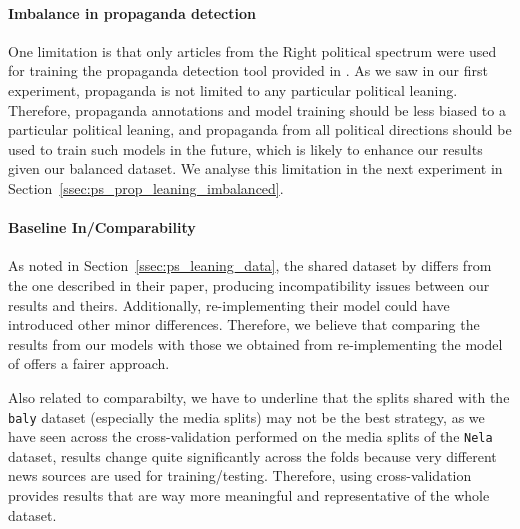 \paragraph{Imbalance in propaganda detection} One limitation is that only articles from the Right political spectrum were used for training the propaganda detection tool provided in \cite{da2019fine}. %
As we saw in our first experiment, propaganda is not limited to any particular political leaning. Therefore, propaganda annotations and model training should be less biased to a particular political leaning, and propaganda from all political directions should be used to train such models in the future, which is likely to enhance our results given our balanced dataset. We analyse this limitation in the next experiment in Section~\ref{ssec:ps_prop_leaning_imbalanced}.

\paragraph{Baseline In/Comparability} %
As noted in Section~\ref{ssec:ps_leaning_data}, the shared dataset by \citet{baly2020we} differs from the one described in their paper, producing incompatibility issues between our results and theirs. %
Additionally, re-implementing their model could have introduced other minor differences. Therefore, we believe that comparing the results from our models with those we obtained from re-implementing the model of \citet{baly2020we} offers a fairer approach. %

Also related to comparabilty, we have to underline that the splits shared with the \texttt{baly} dataset (especially the media splits) may not be the best strategy, as we have seen across the cross-validation performed on the media splits of the \texttt{Nela} dataset, results change quite significantly across the folds because very different news sources are used for training/testing. Therefore, using cross-validation provides results that are way more meaningful and representative of the whole dataset.


